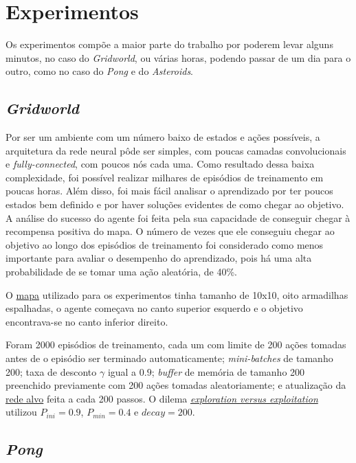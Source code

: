 \section{Experimentos}
\label{sec:exp}

Os experimentos compõe a maior parte do trabalho por poderem levar alguns minutos, no caso do \textit{Gridworld}, ou várias horas, podendo passar de um dia para o outro, como no caso do \textit{Pong} e do \textit{Asteroids}.

\subsection{\textit{Gridworld}}
\label{sec:exp_gridworld}

Por ser um ambiente com um número baixo de estados e ações possíveis, a arquitetura da rede neural pôde ser simples, com poucas camadas convolucionais e \textit{fully-connected}, com poucos nós cada uma.
Como resultado dessa baixa complexidade, foi possível realizar milhares de episódios de treinamento em poucas horas.
Além disso, foi mais fácil analisar o aprendizado por ter poucos estados bem definido e por haver soluções evidentes de como chegar ao objetivo.
A análise do sucesso do agente foi feita pela sua capacidade de conseguir chegar à recompensa positiva do mapa.
O número de vezes que ele conseguiu chegar ao objetivo ao longo dos episódios de treinamento foi considerado como menos importante para avaliar o desempenho do aprendizado, pois há uma alta probabilidade de se tomar uma ação aleatória, de 40\%.

O \hyperref[fig:env_grid]{mapa} utilizado para os experimentos tinha tamanho de 10x10, oito armadilhas espalhadas, o agente começava no canto superior esquerdo e o objetivo encontrava-se no canto inferior direito.

Foram 2000 episódios de treinamento, cada um com limite de 200 ações tomadas antes de o episódio ser terminado automaticamente;
\textit{mini-batches} de tamanho 200;
taxa de desconto $\gamma$ igual a $0.9$; 
\textit{buffer} de memória de tamanho 200 preenchido previamente com 200 ações tomadas aleatoriamente;
e atualização da \hyperref[sec:ft]{rede alvo} feita a cada 200 passos.
O dilema \hyperref[eq:exp_exp_prob]{\textit{exploration versus exploitation}} utilizou $P_{ini} = 0.9$, $P_{min} = 0.4$ e $decay = 200$.

\subsection{\textit{Pong}}
\label{sec:exp_pong}

